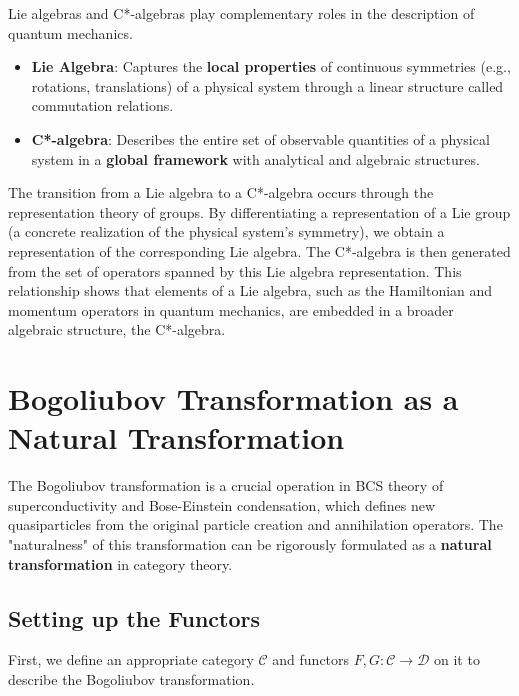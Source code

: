 \documentclass[uplatex,a4j,12pt,dvipdfmx]{article}
\begin{document}
Lie algebras and C*-algebras play complementary roles in the description of quantum mechanics.

\begin{itemize}
    \item \textbf{Lie Algebra}: Captures the \textbf{local properties} of continuous symmetries (e.g., rotations, translations) of a physical system through a linear structure called commutation relations.
    \item \textbf{C*-algebra}: Describes the entire set of observable quantities of a physical system in a \textbf{global framework} with analytical and algebraic structures.
\end{itemize}
The transition from a Lie algebra to a C*-algebra occurs through the representation theory of groups. By differentiating a representation of a Lie group (a concrete realization of the physical system's symmetry), we obtain a representation of the corresponding Lie algebra. The C*-algebra is then generated from the set of operators spanned by this Lie algebra representation. This relationship shows that elements of a Lie algebra, such as the Hamiltonian and momentum operators in quantum mechanics, are embedded in a broader algebraic structure, the C*-algebra.


\section{Bogoliubov Transformation as a Natural Transformation}

The Bogoliubov transformation is a crucial operation in BCS theory of superconductivity and Bose-Einstein condensation, which defines new quasiparticles from the original particle creation and annihilation operators. The "naturalness" of this transformation can be rigorously formulated as a \textbf{natural transformation} in category theory.

\subsection{Setting up the Functors}

First, we define an appropriate category $\mathcal{C}$ and functors $F, G: \mathcal{C} \to \mathcal{D}$ on it to describe the Bogoliubov transformation.
\end{document}
